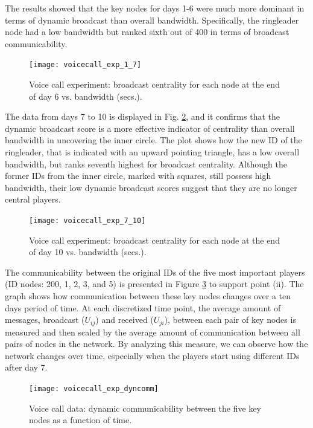 The results showed that the key nodes for days 1-6 were much more dominant in terms of dynamic broadcast than overall bandwidth. Specifically, the ringleader node had a low bandwidth but ranked sixth out of 400 in terms of broadcast communicability.

\begin{figure}[h]\centering
    \texttt{[image: voicecall\_exp\_1\_7]}
    \caption{Voice call experiment: broadcast centrality for each node at the end of day 6 vs. bandwidth (secs.).}
    \label{fig:ve1a}
    \bigskip
\end{figure}

The data from days 7 to 10 is displayed in Fig. \ref{fig:ve1b}, and it confirms that the dynamic broadcast score is a more effective indicator of centrality than overall bandwidth in uncovering the inner circle. The plot shows how the new ID of the ringleader, that is indicated with an upward pointing triangle, has a low overall bandwidth, but ranks seventh highest for broadcast centrality. Although the former IDs from the inner circle, marked with squares, still possess high bandwidth, their low dynamic broadcast scores suggest that they are no longer central players.

\begin{figure}[h]\centering
    \texttt{[image: voicecall\_exp\_7\_10]}
    \caption{Voice call experiment: broadcast centrality for each node at the end of day 10 vs. bandwidth (secs.).}
    \label{fig:ve1b}
    \bigskip
\end{figure}

The communicability between the original IDs of the five most important players (ID nodes: 200, 1, 2, 3, and 5) is presented in Figure \ref{fig:ve2} to support point (ii). The graph shows how communication between these key nodes changes over a ten days period of time. At each discretized time point, the average amount of messages, broadcast ($U_{ij}$) and received ($U_{ji}$), between each pair of key nodes is measured and then scaled by the average amount of communication between all pairs of nodes in the network. By analyzing this measure, we can observe how the network changes over time, especially when the players start using different IDs after day 7.

\begin{figure}[h]\centering
    \texttt{[image: voicecall\_exp\_dyncomm]}
    \caption{Voice call data: dynamic communicability between the five key nodes as a function of time.}
    \label{fig:ve2}
    \bigskip
\end{figure}